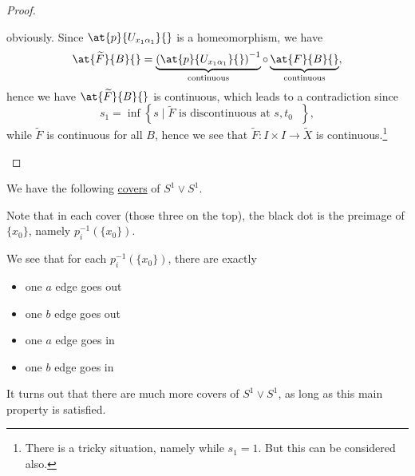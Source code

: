 \begin{proof}
\begin{enumerate}
		      obviously. Since \(\at{p}{U_{x_1 \alpha _1}}{}\) is a homeomorphism, we have
		      \[
			      \at{\widetilde{F} }{B}{} = \underbrace{\left(\at{p}{U_{x_1 \alpha _1}}{} \right)^{-1}}_{\text{continuous} } \circ \underbrace{\vphantom{\left(\at{p}{U_{x_1 \alpha _1}}{} \right)^{-1}}\at{F}{B}{}}_{\text{continuous} },
		      \]
		      hence we have \(\at{\widetilde{F} }{B}{} \) is continuous, which leads to a contradiction since
		      \[
			      s_1 = \inf \left\{s\mid \widetilde{F} \text{ is discontinuous at \(s, t_0\) } \right\},
		      \]
		      while \(\widetilde{F} \) is continuous for all \(B\), hence we see that \(\widetilde{F} :I\times I\to \widetilde{X} \) is continuous.\footnote{There is a tricky situation, namely while \(s_1 = 1\). But this can be considered also.}
	\end{enumerate}
\end{proof}

\begin{eg}
	We have the following \hyperref[def:covering-map]{covers} of \(S^1 \vee S^1\).
	\begin{figure}[H]
		\centering
		\label{fig:eg:lec14:1}
	\end{figure}
	Note that in each cover (those three on the top), the black dot is the preimage of \(\{x_0\}\), namely \(p_{i}^{-1} (\{x_0\})\).
	\begin{remark}
		We see that for each \(p_{i}^{-1} (\{x_0\})\), there are exactly
		\begin{itemize}
			\item one \(a\) edge goes out
			\item one \(b\) edge goes out
			\item one \(a\) edge goes in
			\item one \(b\) edge goes in
		\end{itemize}

		It turns out that there are much more covers of \(S^1\vee S^1\), as long as this main property is satisfied.
	\end{remark}
\end{eg}

